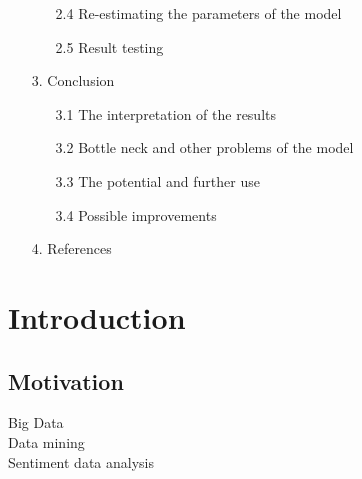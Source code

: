 \documentclass {article}
\begin{document}
\begin{enumerate}
\begin{enumerate}
			\item[2.4] Re-estimating the parameters of the model 
			\item[2.5] Result testing
		\end{enumerate}
	\item[3.] Conclusion
		\begin{enumerate}
			\item[3.1] The interpretation of the results
			\item[3.2] Bottle neck and other problems of the model
			\item[3.3] The potential and further use
			\item[3.4] Possible improvements
		\end{enumerate}
	\item[4.] References
\end{enumerate}

\newpage
\section{Introduction}
\subsection{Motivation}
Big Data\\
Data mining\\
Sentiment data analysis
\end{document}

